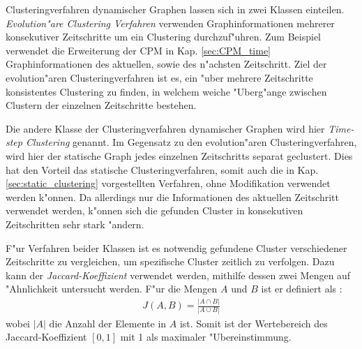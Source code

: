 \documentclass[journal]{vgtc}
\begin{document}
  Clusteringverfahren dynamischer Graphen lassen sich in zwei Klassen einteilen. \emph{Evolution"are Clustering Verfahren}\cite{evolutionary_clustering}
  verwenden Graphinformationen mehrerer konsekutiver Zeitschritte um ein Clustering durchzuf"uhren. Zum Beispiel verwendet die Erweiterung der CPM
  in Kap. \ref{sec:CPM_time} Graphinformationen des aktuellen, sowie des n"achsten Zeitschritt. Ziel der evolution"aren Clusteringverfahren
  ist es, ein "uber mehrere Zeitschritte konsistentes Clustering zu finden, in welchem weiche "Uberg"ange zwischen Clustern der einzelnen Zeitschritte
  bestehen.
  
  Die andere Klasse der Clusteringverfahren dynamischer Graphen wird hier \emph{Time-step Clustering} genannt. Im Gegensatz zu den evolution"aren
  Clusteringverfahren, wird hier der statische Graph jedes einzelnen Zeitschritts separat geclustert. Dies hat den Vorteil das
  statische Clusteringverfahren, somit auch die in Kap. \ref{sec:static_clustering} vorgestellten Verfahren, ohne Modifikation
  verwendet werden k"onnen. Da allerdings nur die Informationen des aktuellen Zeitschritt verwendet werden, k"onnen sich die gefunden Cluster in konsekutiven
  Zeitschritten sehr stark "andern.
  
  F"ur Verfahren beider Klassen ist es notwendig gefundene Cluster verschiedener Zeitschritte zu vergleichen, um spezifische Cluster
  zeitlich zu verfolgen. Dazu kann der \emph{Jaccard-Koeffizient} verwendet werden, mithilfe dessen zwei Mengen auf "Ahnlichkeit
  untersucht werden. F"ur die Mengen $A$ und $B$ ist er definiert als \cite{timestep}:
  \begin{align}
    J(A,B)=\frac{|A \cap B|}{|A \cup B|}
  \end{align}
  wobei $|A|$ die Anzahl der Elemente in $A$ ist. Somit ist der Wertebereich des Jaccard-Koeffizient $[0,1]$ mit 1 als maximaler "Ubereinstimmung.
  
\end{document}
